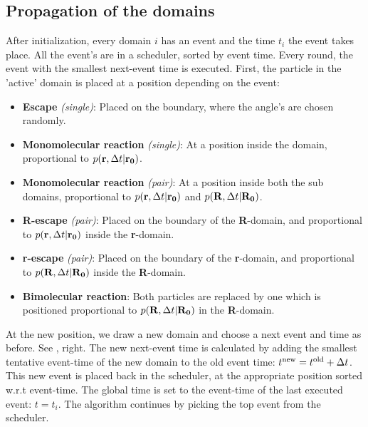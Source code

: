 \subsection{Propagation of the domains}
After initialization, every domain $i$ has an event and the time $t_i$ the event takes place. All the event's are in a scheduler, sorted by event time. Every round, the event with the smallest next-event time is executed. First, the particle in the 'active' domain is placed at a position depending on the event: 
\begin{itemize}
 \item {\bf Escape} {\it (single)}: Placed on the boundary, where the angle's are chosen randomly.
 \item {\bf Monomolecular reaction} {\it (single)}: At a position inside the domain, proportional to $p({\bf r},\Delta t|{\bf r_0})$.
 \item {\bf Monomolecular reaction} {\it (pair)}: At a position inside both the sub domains, proportional to $p({\bf r},\Delta t|{\bf r_0})$ and $p({\bf R},\Delta t|{\bf R_0})$.
 \item {\bf R-escape} {\it (pair)}: Placed on the boundary of the {\bf R}-domain, and proportional to $p({\bf r},\Delta t|{\bf r_0})$ inside the {\bf r}-domain.
 \item {\bf r-escape} {\it (pair)}: Placed on the boundary of the {\bf r}-domain, and proportional to $p({\bf R},\Delta t|{\bf R_0})$ inside the {\bf R}-domain. 
 \item {\bf Bimolecular reaction}: Both particles are replaced by one which is positioned proportional to $p({\bf R},\Delta t|{\bf R_0})$ in the {\bf R}-domain.
\end{itemize}
At the new position, we draw a new domain and choose a next event and time as before. See , right. The new next-event time is calculated by adding the smallest tentative event-time of the new domain to the old event time: $t^{\rm new} =  t^{\rm old} + \Delta t$. This new event is placed back in the scheduler, at the appropriate position sorted w.r.t event-time. The global time is set to the event-time of the last executed event: $t=t_i$. The algorithm continues by picking the top event from the scheduler.